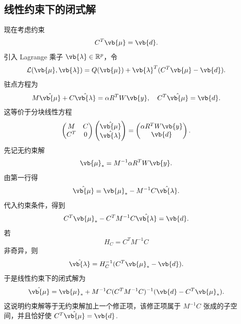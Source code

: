 \subsection{线性约束下的闭式解}

现在考虑约束
\begin{equation*}
	C^T\vb{\mu}=\vb{d}.
\end{equation*}
引入 Lagrange 乘子 \(\vb{\lambda}\in\mathbb{R}^p\)，令
\begin{equation*}
	\mathcal{L}(\vb{\mu},\vb{\lambda})
	=Q(\vb{\mu})+\vb{\lambda}^T(C^T\vb{\mu}-\vb{d}).
\end{equation*}
驻点方程为
\begin{equation*}
	M\hat{\vb{\mu}}+C\hat{\vb{\lambda}}
	=\alpha R^TW\vb{y},
	\quad
	C^T\hat{\vb{\mu}}=\vb{d}.
\end{equation*}
这等价于分块线性方程
\begin{equation*}
	\begin{pmatrix}
		M & C\\
		C^T & 0
	\end{pmatrix}
	\begin{pmatrix}
		\hat{\vb{\mu}}\\
		\hat{\vb{\lambda}}
	\end{pmatrix}
	=
	\begin{pmatrix}
		\alpha R^TW\vb{y}\\
		\vb{d}
	\end{pmatrix}.
\end{equation*}
先记无约束解
\begin{equation*}
	\vb{\mu}_*=
	M^{-1}\alpha R^TW\vb{y}.
\end{equation*}
由第一行得
\begin{equation*}
	\hat{\vb{\mu}}
	=\vb{\mu}_*-M^{-1}C\hat{\vb{\lambda}}.
\end{equation*}
代入约束条件，得到
\begin{equation*}
	C^T\vb{\mu}_*-C^TM^{-1}C\hat{\vb{\lambda}}=\vb{d}.
\end{equation*}
若
\begin{equation*}
	H_C=C^TM^{-1}C
\end{equation*}
非奇异，则
\begin{equation*}
	\hat{\vb{\lambda}}
	=H_C^{-1}(C^T\vb{\mu}_*-\vb{d}).
\end{equation*}
于是线性约束下的闭式解为
\begin{equation*}
	\hat{\vb{\mu}}
	=\vb{\mu}_*
	+M^{-1}C(C^TM^{-1}C)^{-1}
	(\vb{d}-C^T\vb{\mu}_*).
\end{equation*}
这说明约束解等于无约束解加上一个修正项，该修正项属于 \(M^{-1}C\) 张成的子空间，并且恰好使 \(C^T\hat{\vb{\mu}}=\vb{d}\).

